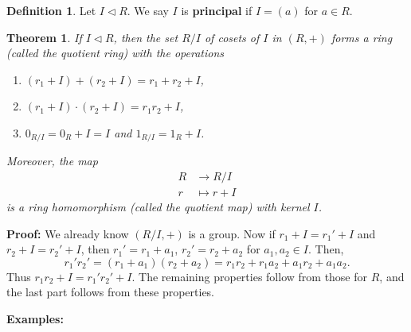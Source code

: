 \documentclass[12pt]{article}
\newtheorem{theorem}{Theorem}[section]
\theoremstyle{definition}
\newtheorem{definition}{Definition}[section]
\theoremstyle{remark}
\begin{document}
\begin{definition}
	Let $I \lhd R$. We say $I$ is \textbf{principal} if $I = (a)$ for $a \in R$.
\end{definition}

\begin{theorem} 
	If $I \lhd R$, then the set $R/I$ of cosets of $I$ in $(R, +)$ forms a ring (called the quotient ring) with the operations
	\begin{enumerate}[label = (\roman*)]
	\item $(r_1 + I) + (r_2 + I) = r_1 + r_2 + I$,
	\item $(r_1 + I) \cdot (r_2 + I) = r_1r_2 + I$,
	\item $0_{R/I} = 0_{R} + I = I$ and $1_{R/I} = 1_{R} + I$.
	\end{enumerate}
	Moreover, the map
	\begin{align*}
		R &\to R/I \\
		r &\mapsto r + I
	\end{align*}
	is a ring homomorphism (called the quotient map) with kernel $I$.
\end{theorem}

\begin{adjustbox}{minipage = \columnwidth - 25.5pt, margin=1em, frame=1pt, margin=0em}
	\textbf{Proof:} We already know $(R/I, +)$ is a group. Now if $r_1 + I = r_1' + I$ and $r_2 + I = r_2' + I$, then $r_1' = r_1 + a_1$, $r_2' = r_2 + a_2$ for $a_1, a_2 \in I$. Then,
	\[
		r_1'r_2' = (r_1 + a_1)(r_2 + a_2) = r_1r_2 + r_1a_2 + a_1r_2 + a_1a_2
	.\]
	Thus $r_1r_2 + I = r_1'r_2' + I$. The remaining properties follow from those for $R$, and the last part follows from these properties.
\end{adjustbox}
\newpage

\textbf{Examples:}
\end{document}
